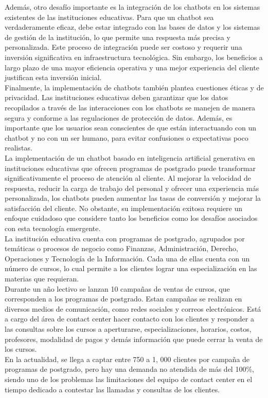 \documentclass[10pt,a4paper]{article}
\begin{document}
Además, otro desafío importante es la integración de los chatbots en los sistemas existentes de las instituciones educativas. Para que un chatbot sea verdaderamente eficaz, debe estar integrado con las bases de datos y los sistemas de gestión de la institución, lo que permite una respuesta más precisa y personalizada. Este proceso de integración puede ser costoso y requerir una inversión significativa en infraestructura tecnológica. Sin embargo, los beneficios a largo plazo de una mayor eficiencia operativa y una mejor experiencia del cliente justifican esta inversión inicial.\\

Finalmente, la implementación de chatbots también plantea cuestiones éticas y de privacidad. Las instituciones educativas deben garantizar que los datos recopilados a través de las interacciones con los chatbots se manejen de manera segura y conforme a las regulaciones de protección de datos. Además, es importante que los usuarios sean conscientes de que están interactuando con un chatbot y no con un ser humano, para evitar confusiones o expectativas poco realistas.\\

La implementación de un chatbot basado en inteligencia artificial generativa en instituciones educativas que ofrecen programas de postgrado puede transformar significativamente el proceso de atención al cliente. Al mejorar la velocidad de respuesta, reducir la carga de trabajo del personal y ofrecer una experiencia más personalizada, los chatbots pueden aumentar las tasas de conversión y mejorar la satisfacción del cliente. No obstante, su implementación exitosa requiere un enfoque cuidadoso que considere tanto los beneficios como los desafíos asociados con esta tecnología emergente.\\

La institución educativa cuenta con programas de postgrado, agrupados por temáticas o procesos de negocio como Finanzas, Administración, Derecho, Operaciones y Tecnología de la Información. Cada una de ellas cuenta con un número de cursos, lo cual permite a los clientes lograr una especialización en las materias que requieran.\\

Durante un año lectivo se lanzan 10 campañas de ventas de cursos, que corresponden a los programas de postgrado. Estan campañas se realizan en diversos medios de comunicación, como redes sociales y correos electrónicos. Está a cargo del área de contact center hacer contacto con los clientes y responder a las consultas sobre los cursos a aperturarse, especializaciones, horarios, costos, profesores, modalidad de pagos y demás información que puede cerrar la venta de los cursos.\\

En la actualidad, se llega a captar entre 750 a 1, 000 clientes por campaña de programas de postgrado, pero hay una demanda no atendida de más del 100\%, siendo uno de los problemas las limitaciones del equipo de contact center en el tiempo dedicado a contestar las llamadas y consultas de los clientes.

		    
	
\end{document}
